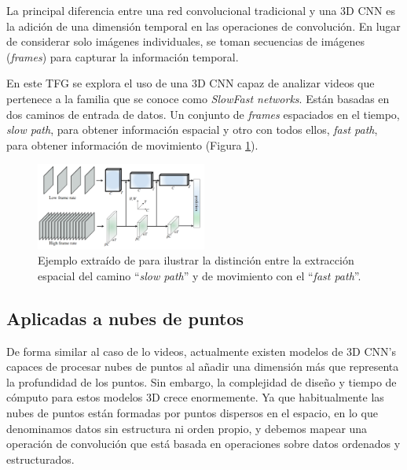 La principal diferencia entre una red convolucional tradicional y una 3D CNN es 
la adición de una dimensión temporal en las operaciones de convolución. 
En lugar de considerar solo imágenes individuales, se toman secuencias de imágenes 
(\emph{frames}) para capturar la información temporal.

En este TFG se explora el uso de una 3D CNN capaz de analizar videos que pertenece 
a la familia que se conoce como \emph{SlowFast networks}\cite{SlowFastNetworks}. Están basadas en dos caminos 
de entrada de datos. Un conjunto de \emph{frames} espaciados en el tiempo, 
\emph{slow path}, para obtener información espacial y otro con todos ellos, \emph{fast path}, 
para obtener información de movimiento (Figura \ref{fig:SlowFastPathways}). 

\begin{figure}[htp]
  \begin{center}
    \includegraphics[width=0.5\textwidth]{imagenes/chapter2/SlowFastPathways.png}
  \end{center}
  \caption[Red convolucional espaciotemporal \emph{SlowFast}.]{Ejemplo extraído de\cite{SlowFastNetworks} para ilustrar la distinción 
  entre la extracción espacial del camino ``\emph{slow path}'' y de movimiento con el ``\emph{fast path}''.}
  \label{fig:SlowFastPathways}
\end{figure}

\subsection{Aplicadas a nubes de puntos}

De forma similar al caso de lo videos, actualmente existen modelos de 3D CNN's 
capaces de procesar nubes de puntos al añadir una dimensión más que representa 
la profundidad de los puntos.  Sin embargo, la complejidad de diseño y tiempo de cómputo para 
estos modelos 3D crece enormemente. Ya que habitualmente las nubes de puntos 
están formadas por puntos dispersos en el espacio, en lo que denominamos datos 
sin estructura ni orden propio, y debemos mapear una operación 
de convolución que está basada en operaciones sobre datos ordenados y estructurados. 

